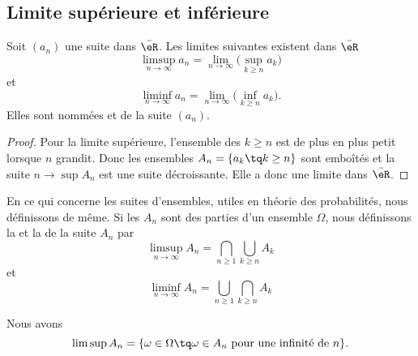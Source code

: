 \subsection{Limite supérieure et inférieure}

\begin{lemmaDef}      \label{ooMVZAooVVCOnP}
	Soit \( (a_n)\) une suite dans \( \bar \eR\). Les limites suivantes existent dans \( \bar \eR\)
	\begin{equation}
		\limsup_{n\to\infty}a_n=\lim_{n\to \infty}\big( \sup_{k\geq n}a_k \big)
	\end{equation}
	et
	\begin{equation}
		\liminf_{n\to \infty}a_n=\lim_{n\to\infty}\big( \inf_{k\geq n}a_k \big).
	\end{equation}
	Elles sont nommées  et  de la suite \( (a_n)\).
\end{lemmaDef}

\begin{proof}
	Pour la limite supérieure, l'ensemble des \( k\geq n\) est de plus en plus petit lorsque \( n\) grandit. Donc les ensembles \( A_n=\{ a_k\tq k\geq n \}\) sont emboîtés et la suite \( n\to \sup A_n\) est une suite décroissante. Elle a donc une limite dans \( \bar \eR\).
\end{proof}

\begin{normaltext}      \label{ooEEQJooRMFzVR}
	En ce qui concerne les suites d'ensembles, utiles en théorie des probabilités, nous définissons de même. Si les \( A_n\) sont des parties d'un ensemble \( \Omega\), nous définissons la  et la  de la suite \( A_n\) par
	\begin{equation}
		\limsup_{n\to\infty}A_n=\bigcap_{n\geq 1}\bigcup_{k\geq n}A_k
	\end{equation}
	et
	\begin{equation}
		\liminf_{n\to\infty}A_n=\bigcup_{n\geq 1}\bigcap_{k\geq n}A_k
	\end{equation}

	Nous avons
	\begin{equation}
		\limsup A_n=\{ \omega\in\Omega\tq \omega\in A_n\text{ pour une infinité de } n \}.
	\end{equation}
\end{normaltext}


